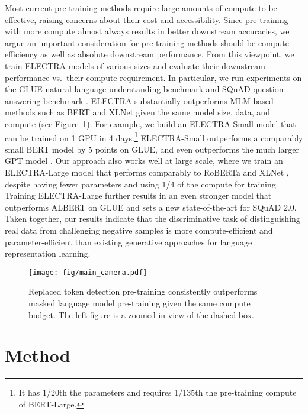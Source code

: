 \documentclass{article}
\begin{document}
Most current pre-training methods require large amounts of compute to be effective, raising concerns about their cost and accessibility.
Since pre-training with more compute almost always results in better downstream accuracies, we argue an important consideration for pre-training methods should be compute efficiency as well as absolute downstream performance.
From this viewpoint, we train ELECTRA models of various sizes and evaluate their downstream performance vs.\ their compute requirement.
In particular, we run experiments on the GLUE natural language understanding benchmark \citep{wang2018glue} and SQuAD question answering benchmark \citep{Rajpurkar2016SQuAD10}.
ELECTRA substantially outperforms MLM-based methods such as BERT and XLNet given the same model size, data, and compute (see Figure~\ref{fig:main}).
For example, we build an ELECTRA-Small model that can be trained on 1 GPU in 4 days.\footnote{It has 1/20th the parameters and requires 1/135th the pre-training compute of BERT-Large.}
ELECTRA-Small outperforms a comparably small BERT model by 5 points on GLUE, and even outperforms the much larger GPT model \citep{radford2018improving}.
Our approach also works well at large scale, where we train an ELECTRA-Large model that performs comparably to RoBERTa \citep{liu2019roberta} and XLNet \citep{yang2019xlnet}, despite having fewer parameters and using 1/4 of the compute for training.
Training ELECTRA-Large further results in an even stronger model that outperforms ALBERT \citep{lan2019albert} on GLUE and sets a new state-of-the-art for SQuAD 2.0.  
Taken together, our results indicate that the discriminative task of distinguishing real data from challenging negative samples is more compute-efficient and parameter-efficient than existing generative approaches for
language representation learning.

\begin{figure}[tb]
\begin{center}
\texttt{[image: fig/main\_camera.pdf]}
\end{center}
\caption{Replaced token detection pre-training consistently outperforms masked language model pre-training given the same compute budget. The left figure is a zoomed-in view of the dashed box.}
\label{fig:main}
\end{figure}

\section{Method}
\label{sec:method}
\end{document}
